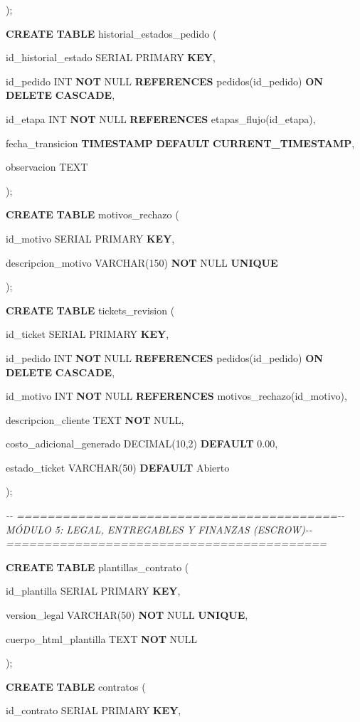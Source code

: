 \documentclass[
]{article}
\begin{document}
);

\textbf{CREATE} \textbf{TABLE} historial\_estados\_pedido (

id\_historial\_estado SERIAL PRIMARY \textbf{KEY},

id\_pedido INT \textbf{NOT} NULL \textbf{REFERENCES} pedidos(id\_pedido)
\textbf{ON} \textbf{DELETE} \textbf{CASCADE},

id\_etapa INT \textbf{NOT} NULL \textbf{REFERENCES}
etapas\_flujo(id\_etapa),

fecha\_transicion \textbf{TIMESTAMP} \textbf{DEFAULT}
\textbf{CURRENT\_TIMESTAMP},

observacion TEXT

);

\textbf{CREATE} \textbf{TABLE} motivos\_rechazo (

id\_motivo SERIAL PRIMARY \textbf{KEY},

descripcion\_motivo VARCHAR(150) \textbf{NOT} NULL \textbf{UNIQUE}

);

\textbf{CREATE} \textbf{TABLE} tickets\_revision (

id\_ticket SERIAL PRIMARY \textbf{KEY},

id\_pedido INT \textbf{NOT} NULL \textbf{REFERENCES} pedidos(id\_pedido)
\textbf{ON} \textbf{DELETE} \textbf{CASCADE},

id\_motivo INT \textbf{NOT} NULL \textbf{REFERENCES}
motivos\_rechazo(id\_motivo),

descripcion\_cliente TEXT \textbf{NOT} NULL,

costo\_adicional\_generado DECIMAL(10,2) \textbf{DEFAULT} 0.00,

estado\_ticket VARCHAR(50) \textbf{DEFAULT}
\textquotesingle Abierto\textquotesingle{}

);

\emph{-\/- ==========================================-\/- MÓDULO 5:
LEGAL, ENTREGABLES Y FINANZAS (ESCROW)-\/-
==========================================}

\textbf{CREATE} \textbf{TABLE} plantillas\_contrato (

id\_plantilla SERIAL PRIMARY \textbf{KEY},

version\_legal VARCHAR(50) \textbf{NOT} NULL \textbf{UNIQUE},

cuerpo\_html\_plantilla TEXT \textbf{NOT} NULL

);

\textbf{CREATE} \textbf{TABLE} contratos (

id\_contrato SERIAL PRIMARY \textbf{KEY},
\end{document}

